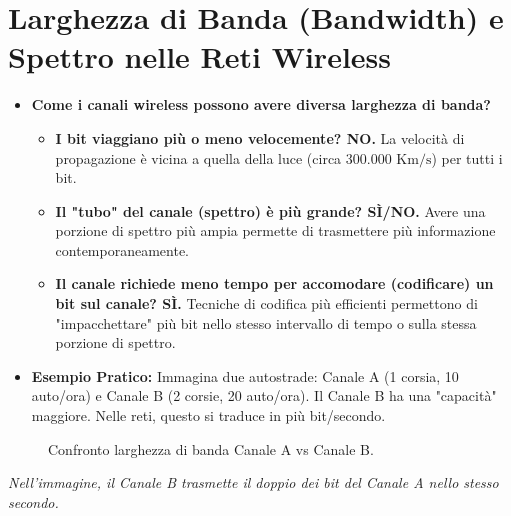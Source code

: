 \section{Larghezza di Banda (Bandwidth) e Spettro nelle Reti Wireless}

\begin{itemize}
    \item \textbf{Come i canali wireless possono avere diversa larghezza di banda?}
    \begin{itemize}
        \item \textbf{I bit viaggiano più o meno velocemente? NO.} La velocità di propagazione è vicina a quella della luce (circa $300.000 \text{ Km/s}$) per tutti i bit.
        \item \textbf{Il "tubo" del canale (spettro) è più grande? SÌ/NO.} Avere una porzione di spettro più ampia permette di trasmettere più informazione contemporaneamente.
        \item \textbf{Il canale richiede meno tempo per accomodare (codificare) un bit sul canale? SÌ.} Tecniche di codifica più efficienti permettono di "impacchettare" più bit nello stesso intervallo di tempo o sulla stessa porzione di spettro.
    \end{itemize}
    \item \textbf{Esempio Pratico:}
    Immagina due autostrade: Canale A (1 corsia, 10 auto/ora) e Canale B (2 corsie, 20 auto/ora). Il Canale B ha una "capacità" maggiore. Nelle reti, questo si traduce in più bit/secondo.
\end{itemize}

\begin{figure}[H]
\centering
{}
\caption{Confronto larghezza di banda Canale A vs Canale B.}
\label{fig:bandwidth_comparison}
\end{figure}
\textit{Nell'immagine, il Canale B trasmette il doppio dei bit del Canale A nello stesso secondo.}

